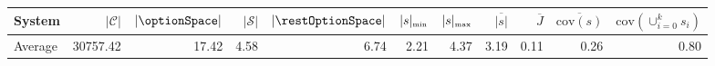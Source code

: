 \begin{tabular}{lrrrrrrrrrr}
\toprule
\multicolumn{1}{l}{System} & $|\mathcal{C}|$ & \multicolumn{1}{r}{$|\optionSpace|$} & $|\mathcal{S}|$ & \multicolumn{1}{r}{$|\restOptionSpace|$} & $|s|_{\text{\tiny min}}$ & $|s|_{\text{\tiny max}}$ & \multicolumn{1}{r}{$\overline{|s|}$} & $\overline{J}$ & $\overline{\text{cov}(s)}$ & ${\text{cov}(\cup_{i=0}^k s_i)}$ \\
\midrule
                   Average &        30757.42 &                                17.42 &            4.58 &                                     6.74 &                     2.21 &                     4.37 &                                 3.19 &           0.11 &                       0.26 &                             0.80 \\
\bottomrule
\end{tabular}
